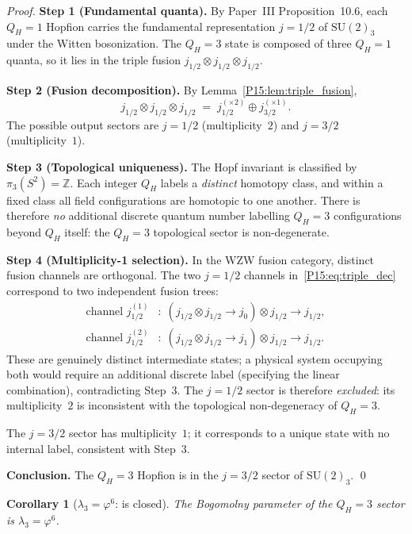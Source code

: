 \documentclass[11pt,a4paper]{article}
\newtheorem{corollary}[theorem]{Corollary}
\theoremstyle{definition}\newtheorem{definition}[theorem]{Definition}
\theoremstyle{remark}
\newcommand{\vp}{\varphi}
\newcommand{\lam}{\lambda}
\newcommand{\QH}{Q_H}
\begin{document}
\begin{proof}
\textbf{Step 1 (Fundamental quanta).}
By Paper~III Proposition~10.6, each $\QH=1$ Hopfion carries
the fundamental representation $j=1/2$ of $\mathrm{SU}(2)_3$
under the Witten bosonization.
The $\QH=3$ state is composed of three $\QH=1$ quanta, so it
lies in the triple fusion $j_{1/2}\otimes j_{1/2}\otimes j_{1/2}$.

\textbf{Step 2 (Fusion decomposition).}
By Lemma~\ref{P15:lem:triple_fusion},
\begin{equation}
  j_{1/2}\otimes j_{1/2}\otimes j_{1/2}
  \;=\; j_{1/2}^{(\times 2)} \oplus j_{3/2}^{(\times 1)}.
  \label{P15:eq:triple_dec}
\end{equation}
The possible output sectors are $j=1/2$ (multiplicity~$2$)
and $j=3/2$ (multiplicity~$1$).

\textbf{Step 3 (Topological uniqueness).}
The Hopf invariant is classified by $\pi_3(S^2)=\mathbb{Z}$.
Each integer $\QH$ labels a \emph{distinct} homotopy class,
and within a fixed class all field configurations are homotopic
to one another.
There is therefore \emph{no} additional discrete quantum number
labelling $\QH=3$ configurations beyond $\QH$ itself: the
$\QH=3$ topological sector is non-degenerate.

\textbf{Step 4 (Multiplicity-1 selection).}
In the WZW fusion category, distinct fusion channels are
orthogonal.
The two $j=1/2$ channels in~\eqref{P15:eq:triple_dec} correspond
to two independent fusion trees:
\begin{align*}
  \text{channel } j_{1/2}^{(1)}&:\;
    (j_{1/2}\otimes j_{1/2}\to j_0)\otimes j_{1/2}\to j_{1/2},\\
  \text{channel } j_{1/2}^{(2)}&:\;
    (j_{1/2}\otimes j_{1/2}\to j_1)\otimes j_{1/2}\to j_{1/2}.
\end{align*}
These are genuinely distinct intermediate states; a physical
system occupying both would require an additional discrete
label (specifying the linear combination), contradicting
Step~3.
The $j=1/2$ sector is therefore \emph{excluded}: its
multiplicity~$2$ is inconsistent with the topological
non-degeneracy of $\QH=3$.

The $j=3/2$ sector has multiplicity~$1$; it corresponds to a
unique state with no internal label, consistent with Step~3.

\textbf{Conclusion.}
The $\QH=3$ Hopfion is in the $j=3/2$ sector of $\mathrm{SU}(2)_3$.
\qed
\end{proof}

\begin{corollary}[$\lam_3=\vp^6$: is closed]
\label{P15:cor:lambda3_proved}
The Bogomolny parameter of the $\QH=3$ sector is $\lam_3=\vp^6$.
\end{corollary}
\end{document}
